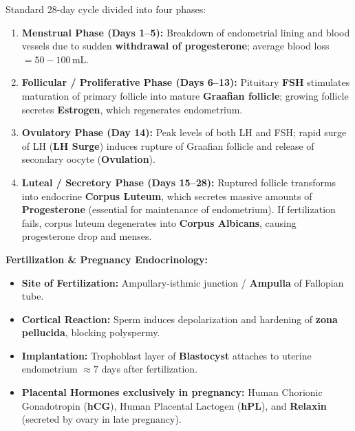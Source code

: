 \documentclass[10pt,a4paper]{article}
\begin{document}
\begin{conceptbox}
Standard 28-day cycle divided into four phases:
\begin{enumerate}
  \item \textbf{Menstrual Phase (Days 1--5):} Breakdown of endometrial lining and blood vessels due to sudden \textbf{withdrawal of progesterone}; average blood loss $= 50-100\,\mathrm{mL}$.
  \item \textbf{Follicular / Proliferative Phase (Days 6--13):} Pituitary \textbf{FSH} stimulates maturation of primary follicle into mature \textbf{Graafian follicle}; growing follicle secretes \textbf{Estrogen}, which regenerates endometrium.
  \item \textbf{Ovulatory Phase (Day 14):} Peak levels of both LH and FSH; rapid surge of LH (\textbf{LH Surge}) induces rupture of Graafian follicle and release of secondary oocyte (\textbf{Ovulation}).
  \item \textbf{Luteal / Secretory Phase (Days 15--28):} Ruptured follicle transforms into endocrine \textbf{Corpus Luteum}, which secretes massive amounts of \textbf{Progesterone} (essential for maintenance of endometrium). If fertilization fails, corpus luteum degenerates into \textbf{Corpus Albicans}, causing progesterone drop and menses.
\end{enumerate}
\textbf{Fertilization \& Pregnancy Endocrinology:}
\begin{itemize}
  \item \textbf{Site of Fertilization:} Ampullary-isthmic junction / \textbf{Ampulla} of Fallopian tube.
  \item \textbf{Cortical Reaction:} Sperm induces depolarization and hardening of \textbf{zona pellucida}, blocking polyspermy.
  \item \textbf{Implantation:} Trophoblast layer of \textbf{Blastocyst} attaches to uterine endometrium $\approx 7$ days after fertilization.
  \item \textbf{Placental Hormones exclusively in pregnancy:} Human Chorionic Gonadotropin (\textbf{hCG}), Human Placental Lactogen (\textbf{hPL}), and \textbf{Relaxin} (secreted by ovary in late pregnancy).
\end{itemize}
\end{conceptbox}
\end{document}
